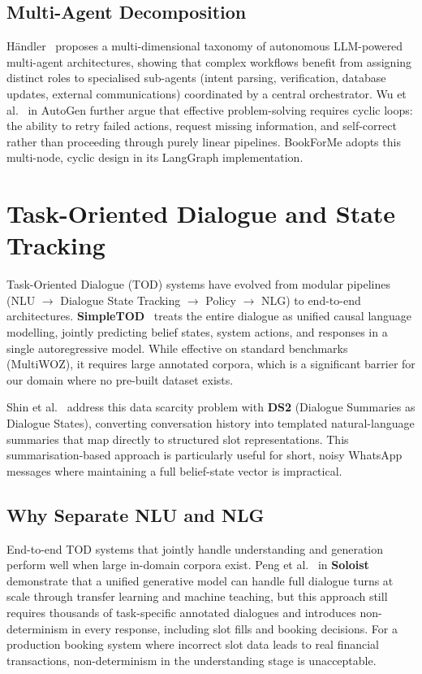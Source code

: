 \subsection{Multi-Agent Decomposition}

H{\"a}ndler~\cite{handler2023} proposes a multi-dimensional taxonomy of
autonomous LLM-powered multi-agent architectures, showing that complex
workflows benefit from assigning distinct roles to specialised sub-agents
(intent parsing, verification, database updates, external communications)
coordinated by a central orchestrator. Wu et al.~\cite{wu2023autogen} in
AutoGen further argue that effective problem-solving requires cyclic loops: the
ability to retry failed actions, request missing information, and self-correct
rather than proceeding through purely linear pipelines. BookForMe adopts this
multi-node, cyclic design in its LangGraph implementation.

\section{Task-Oriented Dialogue and State Tracking}
\label{sec:lit-tod}

Task-Oriented Dialogue (TOD) systems have evolved from modular pipelines
(NLU $\to$ Dialogue State Tracking $\to$ Policy $\to$ NLG) to end-to-end
architectures. \textbf{SimpleTOD}~\cite{hosseini2020} treats the entire
dialogue as unified causal language modelling, jointly predicting belief
states, system actions, and responses in a single autoregressive model. While
effective on standard benchmarks (MultiWOZ), it requires large annotated
corpora, which is a significant barrier for our domain where no pre-built
dataset exists.

Shin et al.~\cite{shin2022} address this data scarcity problem with
\textbf{DS2} (Dialogue Summaries as Dialogue States), converting conversation
history into templated natural-language summaries that map directly to
structured slot representations. This summarisation-based approach is
particularly useful for short, noisy WhatsApp messages where maintaining a
full belief-state vector is impractical.

\subsection{Why Separate NLU and NLG}

End-to-end TOD systems that jointly handle understanding and generation perform
well when large in-domain corpora exist. Peng et al.~\cite{peng2021} in
\textbf{Soloist} demonstrate that a unified generative model can handle full
dialogue turns at scale through transfer learning and machine teaching, but
this approach still requires thousands of task-specific annotated dialogues
and introduces non-determinism in every response, including slot fills and
booking decisions. For a production booking system where incorrect slot data
leads to real financial transactions, non-determinism in the understanding
stage is unacceptable.

